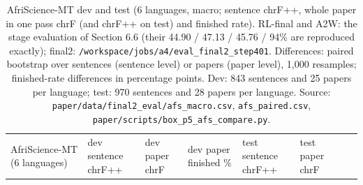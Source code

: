 \begin{table}[t]
\centering
\footnotesize
\setlength{\tabcolsep}{3pt}
\caption{AfriScience-MT dev and test (6 languages, macro; sentence chrF++, whole paper in one pass chrF (and chrF++ on test) and finished rate). RL-final and A2W: the stage evaluation of Section 6.6 (their 44.90 / 47.13 / 45.76 / 94\% are reproduced exactly); final2: \texttt{/workspace/jobs/a4/eval\_final2\_step401}. Differences: paired bootstrap over sentences (sentence level) or papers (paper level), 1,000 resamples; finished-rate differences in percentage points. Dev: 843 sentences and 25 papers per language; test: 970 sentences and 28 papers per language. Source: \texttt{paper/data/final2\_eval/afs\_macro.csv}, \texttt{afs\_paired.csv}, \texttt{paper/scripts/box\_p5\_afs\_compare.py}.}
\label{tab:t_final2_afriscience}
{\def\LTcaptype{none} %
\begin{tabular}{@{}
  >{\raggedright\arraybackslash}p{}
  >{\raggedleft\arraybackslash}p{}
  >{\raggedleft\arraybackslash}p{}
  >{\raggedleft\arraybackslash}p{}
  >{\raggedleft\arraybackslash}p{}
  >{\raggedleft\arraybackslash}p{}
  >{\raggedleft\arraybackslash}p{}
  >{\raggedleft\arraybackslash}p{}@{}}
\toprule
\begin{minipage}[b]{\linewidth}\raggedright
AfriScience-MT (6 languages)
\end{minipage} & \begin{minipage}[b]{\linewidth}\raggedleft
dev sentence chrF++
\end{minipage} & \begin{minipage}[b]{\linewidth}\raggedleft
dev paper chrF
\end{minipage} & \begin{minipage}[b]{\linewidth}\raggedleft
dev paper finished \%
\end{minipage} & \begin{minipage}[b]{\linewidth}\raggedleft
test sentence chrF++
\end{minipage} & \begin{minipage}[b]{\linewidth}\raggedleft
test paper chrF
\end{minipage} & \begin{minipage}[b]{\linewidth}\raggedleft

\end{minipage}
\end{tabular}}
\end{table}
